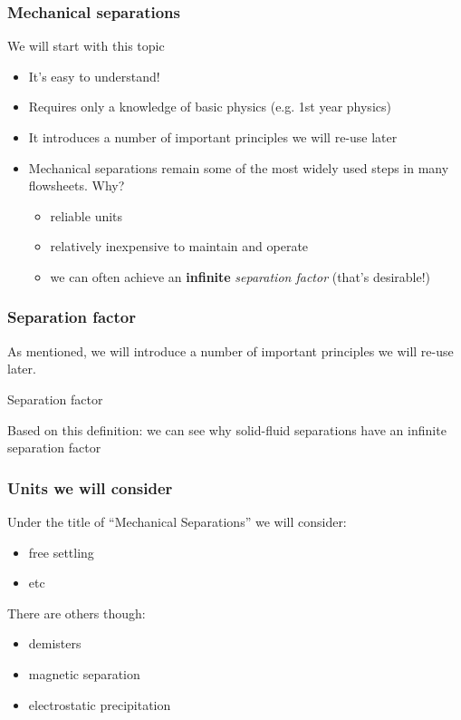\begin{frame}\frametitle{Mechanical separations}
	We will start with this topic
	\begin{itemize}
		\item	It's easy to understand!
		\item	Requires only a knowledge of basic physics (e.g. 1st year physics)
		\item	It introduces a number of important principles we will re-use later
		\item	Mechanical separations remain some of the most widely used steps in many flowsheets. Why?
		\begin{itemize}
			\item	reliable units
			\item	relatively inexpensive to maintain and operate
			\item	we can often achieve an \textbf{infinite} \emph{separation factor} (that's desirable!)
		\end{itemize}
	\end{itemize}
\end{frame}

\begin{frame}\frametitle{Separation factor}
	As mentioned, we will introduce a number of important principles we will re-use later.
	
	\begin{exampleblock}{Separation factor}
	\end{exampleblock}
	
	Based on this definition: we can see why solid-fluid separations have an infinite separation factor
\end{frame}


\begin{frame}\frametitle{Units we will consider}
	Under the title of ``Mechanical Separations'' we will consider:
	\begin{itemize}
		\item	free settling
		\item	etc
	\end{itemize}
	
	\vspace{12pt}
	There are others though:
	\begin{itemize}
		\item	demisters
		\item	magnetic separation
		\item	electrostatic precipitation
	\end{itemize}
\end{frame}
